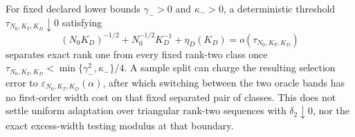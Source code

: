 For fixed declared lower bounds \(\gamma_->0\) and \(\kappa_->0\), a deterministic threshold \(\tau_{N_0,K_T,K_D}\downarrow0\) satisfying
\[
 (N_0K_D)^{-1/2}+N_0^{-1/2}K_D^{-1}
       +\eta_D(K_D)=o(\tau_{N_0,K_T,K_D})
\]
separates exact rank one from every fixed rank-two class once
\(\tau_{N_0,K_T,K_D}<\min\{\gamma_-^2,\kappa_-\}/4\).  A sample split can charge the resulting selection error to \(\varepsilon_{N_0,K_T,K_D}(\alpha)\), after which switching between the two oracle bands has no first-order width cost on that fixed separated pair of classes.  This does not settle uniform adaptation over triangular rank-two sequences with \(\delta_2\downarrow0\), nor the exact excess-width testing modulus at that boundary.